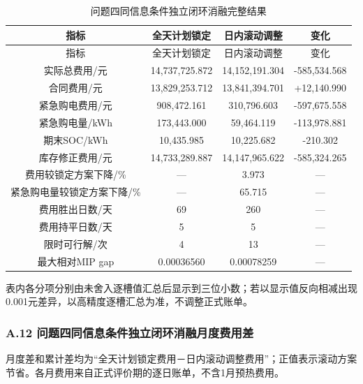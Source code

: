 \documentclass[zihao=-4,a4paper,UTF8,fontset=none]{ctexart}
\begin{document}
\begin{longtable}[]{@{}cccc@{}}
\caption{问题四同信息条件独立闭环消融完整结果}\label{tab:appendix-A-11}\tabularnewline
\toprule\noalign{}
指标 & 全天计划锁定 & 日内滚动调整 & 变化 \\
\midrule\noalign{}
\endfirsthead
\toprule\noalign{}
指标 & 全天计划锁定 & 日内滚动调整 & 变化 \\
\midrule\noalign{}
\endhead
\bottomrule\noalign{}
\endlastfoot
实际总费用/元 & 14,737,725.872 & 14,152,191.304 & -585,534.568 \\
合同费用/元 & 13,829,253.712 & 13,841,394.701 & +12,140.990 \\
紧急购电费用/元 & 908,472.161 & 310,796.603 & -597,675.558 \\
紧急购电量/kWh & 173,443.000 & 59,464.119 & -113,978.881 \\
期末SOC/kWh & 10,435.985 & 10,225.682 & -210.302 \\
库存修正费用/元 & 14,733,289.887 & 14,147,965.622 & -585,324.265 \\
费用较锁定方案下降/\% & --- & 3.973 & --- \\
紧急购电量较锁定方案下降/\% & --- & 65.715 & --- \\
费用胜出日数/天 & 69 & 260 & --- \\
费用持平日数/天 & 5 & 5 & --- \\
限时可行解/次 & 4 & 13 & --- \\
最大相对MIP gap & 0.00036560 & 0.00078259 & --- \\
\end{longtable}

\endgroup

表内各分项分别由未舍入逐槽值汇总后显示到三位小数；若以显示值反向相减出现0.001元差异，以高精度逐槽汇总为准，不调整正式账单。

\par\pagebreak[2]\subsubsection*{A.12 问题四同信息条件独立闭环消融月度费用差}

月度差和累计差均为``全天计划锁定费用－日内滚动调整费用''；正值表示滚动方案节省。各月费用来自正式评价期的逐日账单，不含1月预热费用。

\begingroup\renewcommand{\tablename}{附表}\renewcommand{\thetable}{A-12}
\end{document}

